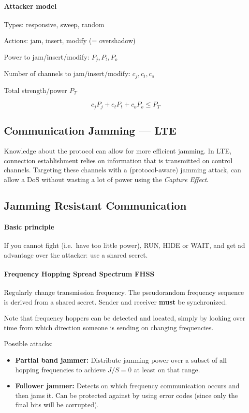 \paragraph{Attacker model}
Types: responsive, sweep, random 

Actions: jam, insert, modify (= overshadow) 

Power to jam/insert/modify: $P_j, P_t, P_o$ 

Number of channels to jam/insert/modify: $c_j, c_t, c_o$ 

Total strength/power $P_T$ 

\[ c_j P_j + c_t P_t + c_o P_o \leq P_T\]

\subsection{Communication Jamming --- LTE}
Knowledge about the protocol can allow for more efficient jamming. In LTE, connection establishment relies on information that is transmitted on control channels. Targeting these channels with a (protocol-aware) jamming attack, can allow a DoS without wasting a lot of power using the \emph{Capture Effect}.
\subsection{Jamming Resistant Communication}\label{sec:jamming-resistant-comm}

\paragraph{Basic principle}
If you cannot fight (i.e.\ have too little power), RUN, HIDE or WAIT, and get ad advantage over the attacker: use a shared secret.

\paragraph{Frequency Hopping Spread Spectrum FHSS}
Regularly change transmission frequency.
The pseudorandom frequency sequence is derived from a shared secret.
Sender and receiver \textbf{must} be synchronized.

Note that frequency hoppers can be detected and located, simply by looking over time from which direction someone is sending on changing frequencies.

Possible attacks:
\begin{itemize}
	\item \textbf{Partial band jammer:}
	Distribute jamming power over a subset of all hopping frequencies to achieve $J/S=0$ at least on that range.
	\item \textbf{Follower jammer:}
	Detects on which frequency communication occurs and then jams it.
	Can be protected against by using error codes (since only the final bits will be corrupted).
\end{itemize}


